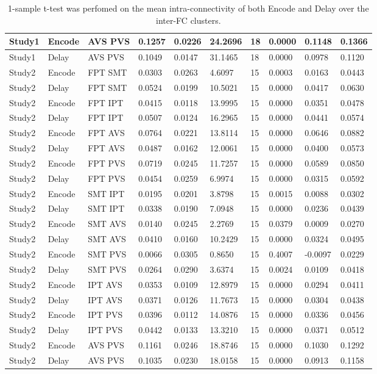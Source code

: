 \begin{table}
\begin{tabular}[0.2em]{@{}llllllllll@{}}
Study1 & Encode & AVS PVS & 0.1257 & 0.0226 & 24.2696 & 18 & 0.0000 & 0.1148 & 0.1366 \\\midrule
Study1 & Delay & AVS PVS & 0.1049 & 0.0147 & 31.1465 & 18 & 0.0000 & 0.0978 & 0.1120 \\\midrule
Study2 & Encode & FPT SMT & 0.0303 & 0.0263 & 4.6097 & 15 & 0.0003 & 0.0163 & 0.0443 \\\midrule
Study2 & Delay & FPT SMT & 0.0524 & 0.0199 & 10.5021 & 15 & 0.0000 & 0.0417 & 0.0630 \\\midrule
Study2 & Encode & FPT IPT & 0.0415 & 0.0118 & 13.9995 & 15 & 0.0000 & 0.0351 & 0.0478 \\\midrule
Study2 & Delay & FPT IPT & 0.0507 & 0.0124 & 16.2965 & 15 & 0.0000 & 0.0441 & 0.0574 \\\midrule
Study2 & Encode & FPT AVS & 0.0764 & 0.0221 & 13.8114 & 15 & 0.0000 & 0.0646 & 0.0882 \\\midrule
Study2 & Delay & FPT AVS & 0.0487 & 0.0162 & 12.0061 & 15 & 0.0000 & 0.0400 & 0.0573 \\\midrule
Study2 & Encode & FPT PVS & 0.0719 & 0.0245 & 11.7257 & 15 & 0.0000 & 0.0589 & 0.0850 \\\midrule
Study2 & Delay & FPT PVS & 0.0454 & 0.0259 & 6.9974 & 15 & 0.0000 & 0.0315 & 0.0592 \\\midrule
Study2 & Encode & SMT IPT & 0.0195 & 0.0201 & 3.8798 & 15 & 0.0015 & 0.0088 & 0.0302 \\\midrule
Study2 & Delay & SMT IPT & 0.0338 & 0.0190 & 7.0948 & 15 & 0.0000 & 0.0236 & 0.0439 \\\midrule
Study2 & Encode & SMT AVS & 0.0140 & 0.0245 & 2.2769 & 15 & 0.0379 & 0.0009 & 0.0270 \\\midrule
Study2 & Delay & SMT AVS & 0.0410 & 0.0160 & 10.2429 & 15 & 0.0000 & 0.0324 & 0.0495 \\\midrule
Study2 & Encode & SMT PVS & 0.0066 & 0.0305 & 0.8650 & 15 & 0.4007 & -0.0097 & 0.0229 \\\midrule
Study2 & Delay & SMT PVS & 0.0264 & 0.0290 & 3.6374 & 15 & 0.0024 & 0.0109 & 0.0418 \\\midrule
Study2 & Encode & IPT AVS & 0.0353 & 0.0109 & 12.8979 & 15 & 0.0000 & 0.0294 & 0.0411 \\\midrule
Study2 & Delay & IPT AVS & 0.0371 & 0.0126 & 11.7673 & 15 & 0.0000 & 0.0304 & 0.0438 \\\midrule
Study2 & Encode & IPT PVS & 0.0396 & 0.0112 & 14.0876 & 15 & 0.0000 & 0.0336 & 0.0456 \\\midrule
Study2 & Delay & IPT PVS & 0.0442 & 0.0133 & 13.3210 & 15 & 0.0000 & 0.0371 & 0.0512 \\\midrule
Study2 & Encode & AVS PVS & 0.1161 & 0.0246 & 18.8746 & 15 & 0.0000 & 0.1030 & 0.1292 \\\midrule
Study2 & Delay & AVS PVS & 0.1035 & 0.0230 & 18.0158 & 15 & 0.0000 & 0.0913 & 0.1158 \\\bottomrule[0.2em]
\end{tabular}
\caption{1-sample t-test was perfomed on the mean intra-connectivity of both Encode and Delay over the inter-FC clusters.\label{tabel:GEMvsRestFC}}
\end{table}
